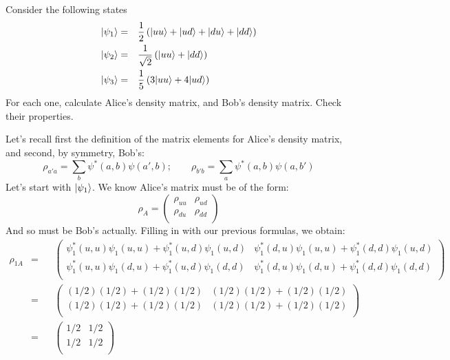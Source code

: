 \documentclass[solutions.tex]{subfiles}
\begin{document}
\maketitle
\begin{exercise} Consider the following states
\begin{equation*}\begin{aligned}
	|\psi_1\rangle &=&& \frac12\left(|uu\rangle+|ud\rangle+|du\rangle+|dd\rangle\right) \\
	|\psi_2\rangle &=&& \frac1{\sqrt2}\left(|uu\rangle+|dd\rangle\right) \\
	|\psi_3\rangle &=&& \frac15\left(3|uu\rangle+4|ud\rangle\right) \\
\end{aligned}\end{equation*}
For each one, calculate Alice's density matrix, and Bob's density matrix.
Check their properties.
\end{exercise}
Let's recall first the definition of the matrix elements for Alice's density
matrix, and second, by symmetry, Bob's:
\[
	\rho_{a'a} = \sum_b\psi^*(a,b)\psi(a',b);\qquad
	\rho_{b'b} = \sum_a\psi^*(a,b)\psi(a,b')
\]
\hr
Let's start with $|\psi_1\rangle$. We know Alice's matrix must be of the form:
\[
	\rho_A = \begin{pmatrix}
		\rho_{uu} & \rho_{ud} \\
		\rho_{du} & \rho_{dd} \\
	\end{pmatrix}
\]
And so must be Bob's actually. Filling in with our previous formulas, we
obtain:
\begin{equation*}\begin{aligned}
	\rho_{1A} &=&& \begin{pmatrix}
		\psi_1^*(u,u)\psi_1(u,u) + \psi_1^*(u,d)\psi_1(u,d) &
			\psi_1^*(d,u)\psi_1(u,u) + \psi_1^*(d,d)\psi_1(u,d) \\
		\psi_1^*(u,u)\psi_1(d,u) + \psi_1^*(u,d)\psi_1(d,d)&
			\psi_1^*(d,u)\psi_1(d,u) + \psi_1^*(d,d)\psi_1(d,d) \\
	\end{pmatrix} \\
	~ &=&& \begin{pmatrix}
		(1/2)(1/2) + (1/2)(1/2) & (1/2)(1/2) + (1/2)(1/2) \\
		(1/2)(1/2) + (1/2)(1/2) & (1/2)(1/2) + (1/2)(1/2) \\
	\end{pmatrix} \\
	~ &=&& \boxed{\begin{pmatrix}
		1/2 & 1/2 \\
		1/2 & 1/2 \\
	\end{pmatrix}}
\end{aligned}\end{equation*}
\end{document}
